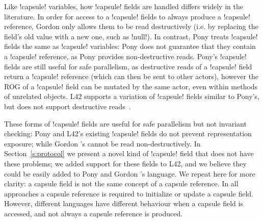 Like \Q!capsule! variables, how \Q!capsule! fields are handled differs widely in the literature. In order for access to a \Q!capsule! fields to always produce a \Q!capsule! reference, Gordon \etal only allows them to be read destructively (i.e. by replacing the field's old value with a new one, such as \Q!null!). 
In contrast, Pony treats \Q!capsule! fields the same as \Q!capsule! variables: Pony does not guarantee that they contain a \Q!capsule! reference, as Pony provides non-destructive reads.
Pony's \Q!capsule! fields are still useful for safe parallelism, as destructive reads of a \Q!capsule! field return a \Q!capsule! reference (which can then be sent to other actors), however the ROG of a \Q!capsule! field can be mutated by the same actor, even within methods of unrelated objects.
L42 supports a variation of \Q!capsule! fields similar to Pony's, but does not support destructive reads~\cite{ServettoEtAl13a,GIANNINI2019145}. 

These forms of \Q!capsule! fields are useful for safe parallelism but not invariant checking: Pony and L42's existing \Q!capsule! fields do not prevent representation exposure; while Gordon \etal's cannot be read non-destructively.
In Section~\ref{s:protocol} we present a novel kind of \Q!capsule! field that does not have these problems; we added support for these fields to L42, and we believe they could be easily added to Pony and Gordon \etal's language.
We repeat here for more clarity: 
a capsule field is not the same concept of a capsule reference. In all approaches a capsule reference is required to initialize or update a capsule field.
However, different languages have different behaviour when a capsule field is accessed, and not always a capsule reference is produced.


